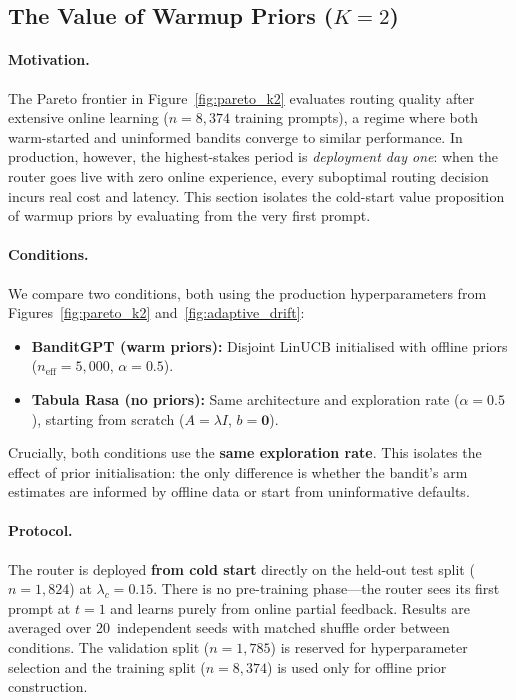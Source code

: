 
\subsection{The Value of Warmup Priors ($K{=}2$)}
\label{sec:warmup_ablation_k2}

\paragraph{Motivation.}
The Pareto frontier in Figure~\ref{fig:pareto_k2} evaluates routing
quality after extensive online learning ($n{=}8{,}374$ training
prompts), a regime where both warm-started and uninformed bandits
converge to similar performance.
In production, however, the highest-stakes period is
\emph{deployment day one}: when the router goes live with zero
online experience, every suboptimal routing decision incurs
real cost and latency.
This section isolates the cold-start value proposition of warmup
priors by evaluating from the very first prompt.

\paragraph{Conditions.}
We compare two conditions, both using the production hyperparameters
from Figures~\ref{fig:pareto_k2} and~\ref{fig:adaptive_drift}:

\begin{itemize}[leftmargin=*,noitemsep]
  \item \textbf{BanditGPT (warm priors):}  Disjoint LinUCB initialised
        with offline priors ($n_{\mathrm{eff}}{=}5{,}000$,
        $\alpha{=}0.5$).
  \item \textbf{Tabula Rasa (no priors):}  Same architecture and
        exploration rate ($\alpha{=}0.5$), starting from scratch
        ($A = \lambda I$, $b = \mathbf{0}$).
\end{itemize}

\noindent
Crucially, both conditions use the \textbf{same exploration rate}.
This isolates the effect of prior initialisation: the only
difference is whether the bandit's arm estimates are informed
by offline data or start from uninformative defaults.

\paragraph{Protocol.}
The router is deployed \textbf{from cold start} directly on the
held-out test split ($n{=}1{,}824$) at $\lambda_c{=}0.15$.
There is no pre-training phase---the router sees its first prompt
at $t{=}1$ and learns purely from online partial feedback.
Results are averaged over 20~independent seeds with matched
shuffle order between conditions.
The validation split ($n{=}1{,}785$) is reserved for hyperparameter
selection and the training split ($n{=}8{,}374$) is used only for
offline prior construction.

